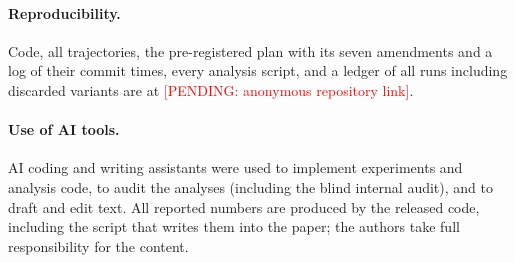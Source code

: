 \documentclass[10pt,a4paper,twocolumn]{article}
\newcommand{\pending}[1]{\textcolor{red}{[PENDING: #1]}}
\begin{document}
\paragraph{Reproducibility.} Code, all trajectories, the pre-registered
plan with its seven amendments and a log of their commit times, every
analysis script, and a ledger of all runs including discarded variants are
at
\pending{anonymous repository link}.

\paragraph{Use of AI tools.} AI coding and writing assistants were used to
implement experiments and analysis code, to audit the analyses (including
the blind internal audit), and to draft and edit text. All reported numbers
are produced by the released code, including the script that writes them
into the paper; the authors take full responsibility for the content.



\end{document}
